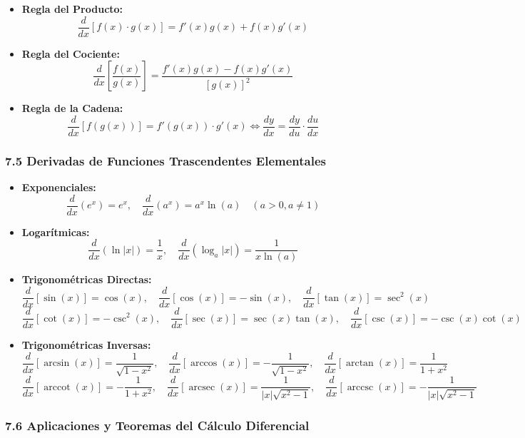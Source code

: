 \documentclass[11pt,a4paper]{article}
\begin{document}
\begin{itemize}
  \item \textbf{Regla del Producto:}
  \[
    \frac{d}{dx}[f(x) \cdot g(x)] = f'(x)g(x) + f(x)g'(x)
  \]
  \item \textbf{Regla del Cociente:}
  \[
    \frac{d}{dx}\left[\frac{f(x)}{g(x)}\right] = \frac{f'(x)g(x) - f(x)g'(x)}{[g(x)]^2}
  \]
  \item \textbf{Regla de la Cadena:}
  \[
    \frac{d}{dx}[f(g(x))] = f'(g(x)) \cdot g'(x) \iff \frac{dy}{dx} = \frac{dy}{du} \cdot \frac{du}{dx}
  \]
\end{itemize}

\subsubsection*{7.5 Derivadas de Funciones Trascendentes Elementales}

\begin{itemize}
  \item \textbf{Exponenciales:}
  \[
    \frac{d}{dx}(e^x) = e^x, \quad \frac{d}{dx}(a^x) = a^x \ln(a) \quad (a > 0, a \ne 1)
  \]
  \item \textbf{Logarítmicas:}
  \[
    \frac{d}{dx}(\ln|x|) = \frac{1}{x}, \quad \frac{d}{dx}(\log_a|x|) = \frac{1}{x\ln(a)}
  \]
  \item \textbf{Trigonométricas Directas:}
  \[
    \frac{d}{dx}[\sin(x)] = \cos(x), \quad \frac{d}{dx}[\cos(x)] = -\sin(x), \quad \frac{d}{dx}[\tan(x)] = \sec^2(x)
  \]
  \[
    \frac{d}{dx}[\cot(x)] = -\csc^2(x), \quad \frac{d}{dx}[\sec(x)] = \sec(x)\tan(x), \quad \frac{d}{dx}[\csc(x)] = -\csc(x)\cot(x)
  \]
  \item \textbf{Trigonométricas Inversas:}
  \[
    \frac{d}{dx}[\arcsin(x)] = \frac{1}{\sqrt{1 - x^2}}, \quad \frac{d}{dx}[\arccos(x)] = -\frac{1}{\sqrt{1 - x^2}}, \quad \frac{d}{dx}[\arctan(x)] = \frac{1}{1 + x^2}
  \]
  \[
    \frac{d}{dx}[\operatorname{arccot}(x)] = -\frac{1}{1 + x^2}, \quad \frac{d}{dx}[\operatorname{arcsec}(x)] = \frac{1}{|x|\sqrt{x^2 - 1}}, \quad \frac{d}{dx}[\operatorname{arccsc}(x)] = -\frac{1}{|x|\sqrt{x^2 - 1}}
  \]
\end{itemize}

\subsubsection*{7.6 Aplicaciones y Teoremas del Cálculo Diferencial}
\end{document}
